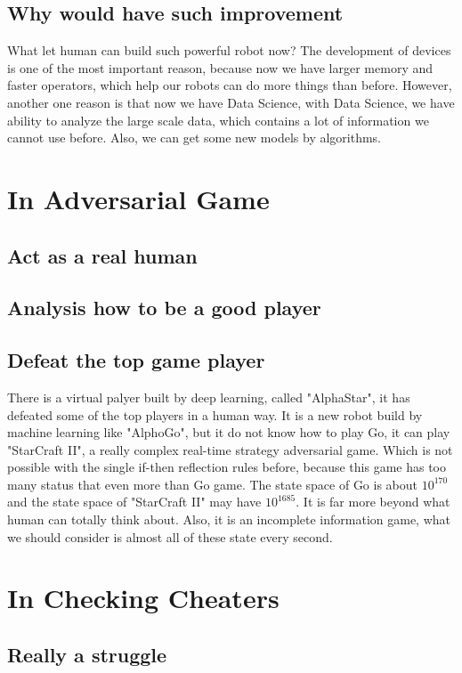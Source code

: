 \documentclass[12pt]{article}
\begin{document}
        \subsection{Why would have such improvement}
            What let human can build such powerful robot now? The development of devices is one of the
            most important reason, because now we have larger memory and faster operators, which
            help our robots can do more things than before. However, another one reason is that
            now we have Data Science, with Data Science, we have ability to analyze the large scale
            data, which contains a lot of information we cannot use before. Also, we can get some
            new models by algorithms.
    \section{In Adversarial Game}
        \subsection{Act as a real human}
        \subsection{Analysis how to be a good player}
        \subsection{Defeat the top game player}
            There is a virtual palyer built by deep learning, called "AlphaStar", it
            has defeated some of the top players in a human way. It is a new robot build by machine
            learning like "AlphoGo", but it do not know how to play Go, it can play
            "StarCraft II", a really complex real-time strategy adversarial game. Which is not
            possible with the single if-then reflection rules before, because this game has too
            many status that even more than Go game. The state space of Go is about $10^{170}$ and
            the state space of "StarCraft II" may have $10^{1685}$. It is far more beyond what
            human can totally think about. Also, it is an incomplete information game, what we should
            consider is almost all of these state every second.
    \section{In Checking Cheaters}
        \subsection{Really a struggle}
\end{document}

